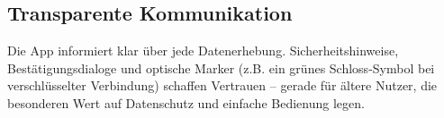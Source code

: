 \subsection{Transparente Kommunikation}
Die App informiert klar über jede Datenerhebung. 
Sicherheitshinweise, Bestätigungsdialoge und optische Marker 
(z.B. ein grünes Schloss-Symbol bei verschlüsselter Verbindung) 
schaffen Vertrauen -- gerade für ältere Nutzer, die besonderen Wert 
auf Datenschutz und einfache Bedienung legen.

